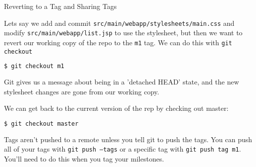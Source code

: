 \documentclass{beamer}
\begin{document}
\begin{frame}[fragile]{Reverting to a Tag and Sharing Tags}


Lets say we add and commit {\tt src/main/webapp/stylesheets/main.css} and modify {\tt src/main/webapp/list.jsp} to use the stylesheet, but then we want to revert our working copy of the repo to the {\tt m1} tag.  We can do this with {\tt git checkout}
\vspace{-.05in}
\begin{lstlisting}[language=bash]
$ git checkout m1
\end{lstlisting}
Git gives us a message about being in a 'detached HEAD' state, and the new stylesheet changes are gone from our working copy.

We can get back to the current version of the rep by checking out master:
\begin{lstlisting}[language=bash]
$ git checkout master
\end{lstlisting}
\vspace{-.05in}
Tags aren't pushed to a remote unless you tell git to push the tags.  You can push all of your tags with {\tt git push --tags} or a specific tag with {\tt git push tag m1}.  You'll need to do this when you tag your milestones.

\end{frame}











\end{document}
